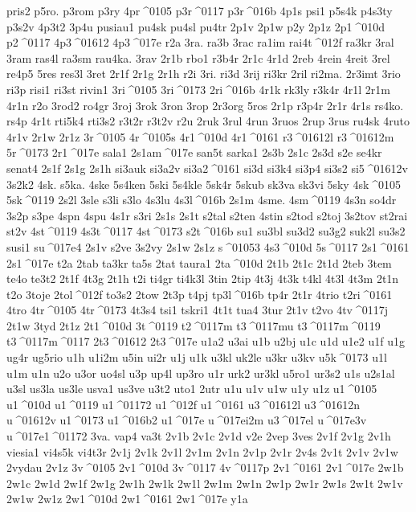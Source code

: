 {pris2
p5ro.
p3rom
p3ry
4pr^^^^0105
p3r^^^^0117
p3r^^^^016b
4p1s
psi1
p5s4k
p4s3ty
p3s2v
4p3t2
3p4u
pusiau1
pu4sk
pu4sl
pu4tr
2p1v
2p1w
p2y
2p1z
2p1^^^^010d
p2^^^^0117
4p3^^^^01612
4p3^^^^017e
r2a
3ra.
ra3b
3rac
ra1im
rai4t^^^^012f
ra3kr
3ral
3ram
ras4l
ra3sm
rau4ka.
3rav
2r1b
rbo1
r3b4r
2r1c
4r1d
2reb
4rein
4reit
3rel
re4p5
5res
res3l
3ret
2r1f
2r1g
2r1h
r2i
3ri.
ri3d
3rij
ri3kr
2ril
ri2ma.
2r3imt
3rio
ri3p
risi1
ri3st
rivin1
3ri^^^^0105
3ri^^^^0173
2ri^^^^016b
4r1k
rk3ly
r3k4r
4r1l
2r1m
4r1n
r2o
3rod2
ro4gr
3roj
3rok
3ron
3rop
2r3org
5ros
2r1p
r3p4r
2r1r
4r1s
rs4ko.
rs4p
4r1t
rti5k4
rti3s2
r3t2r
r3t2v
r2u
2ruk
3rul
4run
3ruos
2rup
3rus
ru4sk
4ruto
4r1v
2r1w
2r1z
3r^^^^0105
4r^^^^0105s
4r1^^^^010d
4r1^^^^0161
r3^^^^01612l
r3^^^^01612m
5r^^^^0173
2r1^^^^017e
sala1
2s1am^^^^017e
san5t
sarka1
2s3b
2s1c
2s3d
s2e
se4kr
senat4
2s1f
2s1g
2s1h
si3auk
si3a2v
si3a2^^^^0161
si3d
si3k4
si3p4
si3s2
si5^^^^01612v
3s2k2
4sk.
s5ka.
4ske
5s4ken
5ski
5s4kle
5sk4r
5skub
sk3va
sk3vi
5sky
4sk^^^^0105
5sk^^^^0119
2s2l
3sle
s3li
s3lo
4s3lu
4s3l^^^^016b
2s1m
4sme.
4sm^^^^0119
4s3n
so4dr
3s2p
s3pe
4spn
4spu
4s1r
s3ri
2s1s
2s1t
s2tal
s2ten
4stin
s2tod
s2toj
3s2tov
st2rai
st2v
4st^^^^0119
4s3t^^^^0117
4st^^^^0173
s2t^^^^016b
su1
su3bl
su3d2
su3g2
suk2l
su3s2
susi1
su^^^^017e4
2s1v
s2ve
3s2vy
2s1w
2s1z
s^^^^01053
4s3^^^^010d
5s^^^^0117
2s1^^^^0161
2s1^^^^017e
t2a
2tab
ta3kr
ta5s
2tat
taura1
2ta^^^^010d
2t1b
2t1c
2t1d
2teb
3tem
te4o
te3t2
2t1f
4t3g
2t1h
t2i
ti4gr
ti4k3l
3tin
2tip
4t3j
4t3k
t4kl
4t3l
4t3m
2t1n
t2o
3toje
2tol^^^^012f
to3s2
2tow
2t3p
t4pj
tp3l^^^^016b
tp4r
2t1r
4trio
t2ri^^^^0161
4tro
4tr^^^^0105
4tr^^^^0173
4t3s4
tsi1
tskri1
4t1t
tua4
3tur
2t1v
t2vo
4tv^^^^0117j
2t1w
3tyd
2t1z
2t1^^^^010d
3t^^^^0119
t2^^^^0117m
t3^^^^0117mu
t3^^^^0117m^^^^0119
t3^^^^0117m^^^^0117
2t3^^^^01612
2t3^^^^017e
u1a2
u3ai
u1b
u2bj
u1c
u1d
u1e2
u1f
u1g
ug4r
ug5rio
u1h
u1i2m
u5in
ui2r
u1j
u1k
u3kl
uk2le
u3kr
u3kv
u5k^^^^0173
u1l
u1m
u1n
u2o
u3or
uo4sl
u3p
up4l
up3ro
u1r
urk2
ur3kl
u5ro1
ur3s2
u1s
u2s1al
u3sl
us3la
us3le
usva1
us3ve
u3t2
uto1
2utr
u1u
u1v
u1w
u1y
u1z
u1^^^^0105
u1^^^^010d
u1^^^^0119
u1^^^^01172
u1^^^^012f
u1^^^^0161
u3^^^^01612l
u3^^^^01612n
u^^^^01612v
u1^^^^0173
u1^^^^016b2
u1^^^^017e
u^^^^017ei2m
u3^^^^017el
u^^^^017e3v
u^^^^017e1^^^^01172
3va.
vap4
va3t
2v1b
2v1c
2v1d
v2e
2vep
3ves
2v1f
2v1g
2v1h
viesia1
vi4s5k
vi4t3r
2v1j
2v1k
2v1l
2v1m
2v1n
2v1p
2v1r
2v4s
2v1t
2v1v
2v1w
2vydau
2v1z
3v^^^^0105
2v1^^^^010d
3v^^^^0117
4v^^^^0117p
2v1^^^^0161
2v1^^^^017e
2w1b
2w1c
2w1d
2w1f
2w1g
2w1h
2w1k
2w1l
2w1m
2w1n
2w1p
2w1r
2w1s
2w1t
2w1v
2w1w
2w1z
2w1^^^^010d
2w1^^^^0161
2w1^^^^017e
y1a
}

